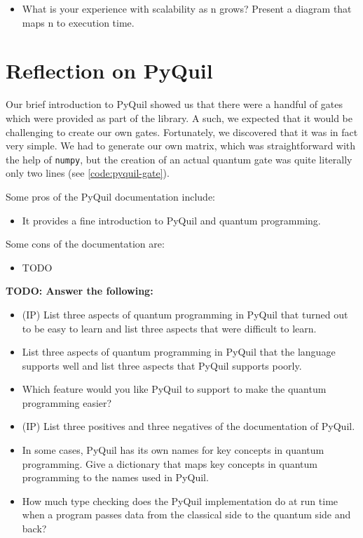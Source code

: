 \documentclass[12pt]{article}
\begin{document}
\begin{itemize}
    \item What is your experience with scalability as n grows?  Present a diagram that maps n to execution time.
\end{itemize}

\section{Reflection on PyQuil}

Our brief introduction to PyQuil showed us that there were a handful of gates which were provided as part of the library.
A such, we expected that it would be challenging to create our own gates.
Fortunately, we discovered that it was in fact very simple.
We had to generate our own matrix, which was straightforward with the help of \texttt{numpy}, but the creation of an actual quantum gate was quite literally only two lines (see \autoref{code:pyquil-gate}).


Some pros of the PyQuil documentation include:
\begin{itemize}
    \item It provides a fine introduction to PyQuil and quantum programming.
\end{itemize}

Some cons of the documentation are:
\begin{itemize}
    \item TODO
\end{itemize}

\textbf{TODO: Answer the following:}
\begin{itemize}
    \item (IP) List three aspects of quantum programming in PyQuil that turned out to be easy to learn and list three aspects that were difficult to learn.
    \item List three aspects of quantum programming in PyQuil that the language supports well and list three aspects that PyQuil supports poorly.
    \item Which feature would you like PyQuil to support to make the quantum programming easier?  
    \item (IP) List three positives and three negatives of the documentation of PyQuil.
    \item In some cases, PyQuil has its own names for key concepts in quantum programming.  Give a dictionary that maps key concepts in quantum programming to the names used in PyQuil.
    \item How much type checking does the PyQuil implementation do at run time when a program passes data from the classical side to the quantum side and back?
\end{itemize}

\end{document}
